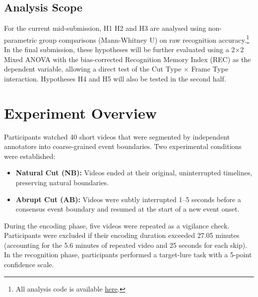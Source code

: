 \documentclass[11pt, a4paper]{article}
\begin{document}


\vspace{8pt}

\subsection*{Analysis Scope}
For the current mid-submission, H1 H2 and H3 are analysed using non-parametric group comparisons (Mann-Whitney U) on raw recognition accuracy.\footnote{All analysis code is available \href{https://github.com/saitejaMaryala/BRSM_PROJECT}{here}.} In the final submission, these hypotheses will be further evaluated using a 2$\times$2 Mixed ANOVA with the bias-corrected Recognition Memory Index (REC) as the dependent variable, allowing a direct test of the Cut Type $\times$ Frame Type interaction. Hypotheses H4 and H5 will also be tested in the second half.

\section{Experiment Overview}

Participants watched 40 short videos that were segmented by independent annotators into coarse-grained event boundaries. Two experimental conditions were established:

\begin{itemize}
    \item \textbf{Natural Cut (NB):} Videos ended at their original, uninterrupted timelines, preserving natural boundaries.
    \item \textbf{Abrupt Cut (AB):} Videos were subtly interrupted 1--5 seconds before a consensus event boundary and resumed at the start of a new event onset.
\end{itemize}

During the encoding phase, five videos were repeated as a vigilance check. Participants were excluded if their encoding duration exceeded 27.05 minutes (accounting for the 5.6 minutes of repeated video and 25 seconds for each skip). In the recognition phase, participants performed a target-lure task with a 5-point confidence scale.
\end{document}
